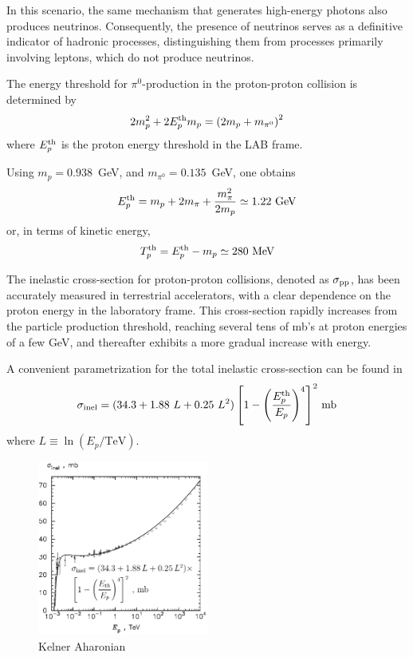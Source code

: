 In this scenario, the same mechanism that generates high-energy photons also produces neutrinos. Consequently, the presence of neutrinos serves as a definitive indicator of hadronic processes, distinguishing them from processes primarily involving leptons, which do not produce neutrinos.

The energy threshold for $\pi^0$-production in the proton-proton collision is determined by
%
\[
2 m_p^2 + 2 E^{\rm th}_p m_p = \left(2 m_p + m_{\pi^0} \right)^2
\]
%
where $E^{\rm th}_p$ is the proton energy threshold in the LAB frame.

Using $m_p = 0.938$~GeV, and $m_{\pi^0} = 0.135$~GeV, one obtains
%
\begin{equation}
E_p^{\rm th} = m_p + 2 m_\pi + \frac{m_\pi^2}{2 m_p} \simeq 1.22~\text{GeV}
\end{equation}
%
or, in terms of kinetic energy,
%
\begin{equation}
T_p^{\rm th} = E_p^{\rm th} - m_p \simeq 280~\text{MeV}
\end{equation}

The inelastic cross-section for proton-proton collisions, denoted as \(\sigma_{\rm pp}\), has been accurately measured in terrestrial accelerators, with a clear dependence on the proton energy in the laboratory frame. This cross-section rapidly increases from the particle production threshold, reaching several tens of mb's at proton energies of a few GeV, and thereafter exhibits a more gradual increase with energy.

A convenient parametrization for the total inelastic cross-section can be found in~\cite{Kelner2006prd}
%
\[
\sigma_{\rm inel} = (34.3 + 1.88~L + 0.25~L^2) \left[ 1 - \left( \frac{E^{\rm th}_p	}{E_p} \right)^4 \right]^2 \, \text{mb}
\]
%
where $L \equiv \ln (E_p / \text{TeV} )$.

\begin{figure}[t]
\centering
\includegraphics[width=0.5\textwidth]{figures/KelnerAharonian11.pdf}
\caption{Kelner Aharonian~\cite{Kelner2006prd}}
\end{figure}

